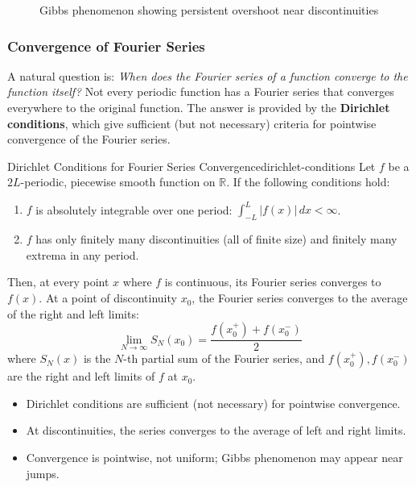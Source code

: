 \begin{figure}[H]
    \centering
    
    \caption{Gibbs phenomenon showing persistent overshoot near discontinuities}
\end{figure}

\subsubsection{Convergence of Fourier Series}
A natural question is: \emph{When does the Fourier series of a function converge to the function itself?}
Not every periodic function has a Fourier series that converges everywhere to the original function.
The answer is provided by the \textbf{Dirichlet conditions}, which give sufficient (but not necessary) criteria for pointwise convergence of the Fourier series.

\begin{theorem}{Dirichlet Conditions for Fourier Series Convergence}{dirichlet-conditions}
    Let \( f \) be a \( 2L \)-periodic, piecewise smooth function on \(\mathbb{R}\). If the following conditions hold:
    \begin{enumerate}
        \item \( f \) is absolutely integrable over one period: \( \int_{-L}^{L} |f(x)|\,dx < \infty \).
        \item \( f \) has only finitely many discontinuities (all of finite size) and finitely many extrema in any period.
    \end{enumerate}
    Then, at every point \( x \) where \( f \) is continuous, its Fourier series converges to \( f(x) \). At a point of discontinuity \( x_0 \), the Fourier series converges to the average of the right and left limits:
    \begin{equation}
        \lim_{N \to \infty} S_N(x_0) = \frac{f(x_0^+) + f(x_0^-)}{2}
    \end{equation}
    where \( S_N(x) \) is the \( N \)-th partial sum of the Fourier series, and \( f(x_0^+), f(x_0^-) \) are the right and left limits of \( f \) at \( x_0 \).
\end{theorem}

\begin{itemize}
    \item Dirichlet conditions are sufficient (not necessary) for pointwise convergence.
    \item At discontinuities, the series converges to the average of left and right limits.
    \item Convergence is pointwise, not uniform; Gibbs phenomenon may appear near jumps.
\end{itemize}

